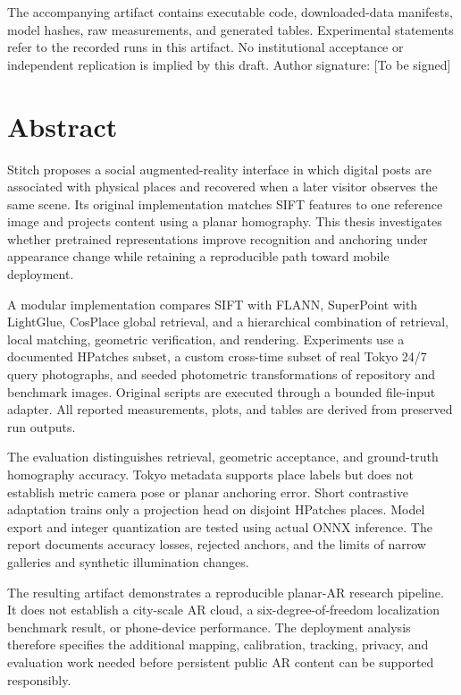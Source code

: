 \documentclass[a4paper,12pt,oneside]{report}
\begin{document}
The accompanying artifact contains executable code, downloaded-data manifests, model hashes, raw measurements, and generated tables. Experimental statements refer to the recorded runs in this artifact. No institutional acceptance or independent replication is implied by this draft.
\vspace{2cm}\noindent Author signature: [To be signed]
\chapter*{Abstract}
Stitch proposes a social augmented-reality interface in which digital posts are associated with physical places and recovered when a later visitor observes the same scene. Its original implementation matches SIFT features to one reference image and projects content using a planar homography. This thesis investigates whether pretrained representations improve recognition and anchoring under appearance change while retaining a reproducible path toward mobile deployment.

A modular implementation compares SIFT with FLANN, SuperPoint with LightGlue, CosPlace global retrieval, and a hierarchical combination of retrieval, local matching, geometric verification, and rendering. Experiments use a documented HPatches subset, a custom cross-time subset of real Tokyo 24/7 query photographs, and seeded photometric transformations of repository and benchmark images. Original scripts are executed through a bounded file-input adapter. All reported measurements, plots, and tables are derived from preserved run outputs.

The evaluation distinguishes retrieval, geometric acceptance, and ground-truth homography accuracy. Tokyo metadata supports place labels but does not establish metric camera pose or planar anchoring error. Short contrastive adaptation trains only a projection head on disjoint HPatches places. Model export and integer quantization are tested using actual ONNX inference. The report documents accuracy losses, rejected anchors, and the limits of narrow galleries and synthetic illumination changes.

The resulting artifact demonstrates a reproducible planar-AR research pipeline. It does not establish a city-scale AR cloud, a six-degree-of-freedom localization benchmark result, or phone-device performance. The deployment analysis therefore specifies the additional mapping, calibration, tracking, privacy, and evaluation work needed before persistent public AR content can be supported responsibly.
\end{document}

